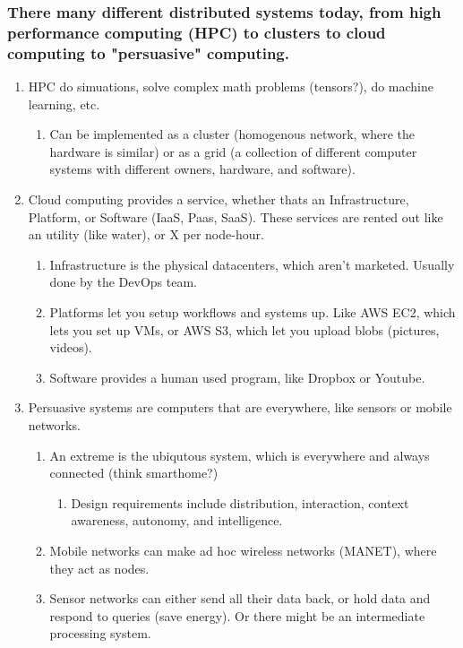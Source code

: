 \documentclass[11pt]{article}
\begin{document}
\subsubsection{There many different distributed systems today, from high performance computing (HPC) to clusters to cloud computing to "persuasive" computing.}
\label{sec-1-1-4}
\begin{enumerate}
\item HPC do simuations, solve complex math problems (tensors?), do machine learning, etc.
\label{sec-1-1-4-1}
\begin{enumerate}
\item Can be implemented as a cluster (homogenous network, where the hardware is similar) or as a grid (a collection of different computer systems with different owners, hardware, and software).
\label{sec-1-1-4-1-1}
\end{enumerate}
\item Cloud computing provides a service, whether thats an Infrastructure, Platform, or Software (IaaS, Paas, SaaS).  These services are rented out like an utility (like water), or X per node-hour.
\label{sec-1-1-4-2}
\begin{enumerate}
\item Infrastructure is the physical datacenters, which aren't marketed.  Usually done by the DevOps team.
\label{sec-1-1-4-2-1}
\item Platforms let you setup workflows and systems up.  Like AWS EC2, which lets you set up VMs, or AWS S3, which let you upload blobs (pictures, videos).
\label{sec-1-1-4-2-2}
\item Software provides a human used program, like Dropbox or Youtube.
\label{sec-1-1-4-2-3}
\end{enumerate}
\item Persuasive systems are computers that are everywhere, like sensors or mobile networks.
\label{sec-1-1-4-3}
\begin{enumerate}
\item An extreme is the ubiqutous system, which is everywhere and always connected (think smarthome?)
\label{sec-1-1-4-3-1}
\begin{enumerate}
\item Design requirements include distribution, interaction, context awareness, autonomy, and intelligence.
\label{sec-1-1-4-3-1-1}
\end{enumerate}
\item Mobile networks can make ad hoc wireless networks (MANET), where they act as nodes.
\label{sec-1-1-4-3-2}
\item Sensor networks can either send all their data back, or hold data and respond to queries (save energy).  Or there might be an intermediate processing system.
\label{sec-1-1-4-3-3}
\end{enumerate}
\end{enumerate}
\end{document}
